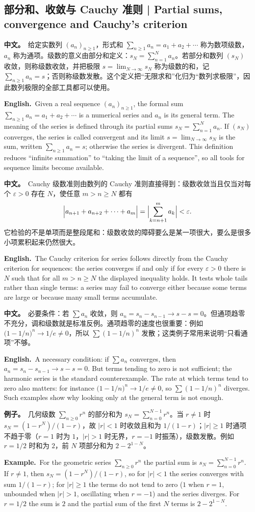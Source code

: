 \documentclass[UTF8,11pt,a4paper]{ctexart}
\newcommand{\BOTH}[2]{\par\noindent\textbf{中文。}\ #1\par\noindent\textbf{English.}\ #2\par}
\newcommand{\EX}[2]{\par\noindent\textbf{例子。}\ #1\par\noindent\textbf{Example.}\ #2\par}
\begin{document}
\subsection{部分和、收敛与 Cauchy 准则 | Partial sums, convergence and Cauchy's criterion}
\BOTH{给定实数列 $(a_n)_{n\ge1}$，形式和 $\sum_{n\ge1}a_n=a_1+a_2+\cdots$ 称为数项级数，$a_n$ 称为通项。级数的意义由部分和定义：$s_N=\sum_{n=1}^{N}a_n$。若部分和数列 $(s_N)$ 收敛，则称级数收敛，并把极限 $s=\lim_{N\to\infty}s_N$ 称为级数的和，记 $\sum_{n\ge1}a_n=s$；否则称级数发散。这个定义把“无限求和”化归为“数列求极限”，因此数列极限的全部工具都可以使用。}{Given a real sequence $(a_n)_{n\ge1}$, the formal sum $\sum_{n\ge1}a_n=a_1+a_2+\cdots$ is a numerical series and $a_n$ is its general term. The meaning of the series is defined through its partial sums $s_N=\sum_{n=1}^{N}a_n$. If $(s_N)$ converges, the series is called convergent and its limit $s=\lim_{N\to\infty}s_N$ is the sum, written $\sum_{n\ge1}a_n=s$; otherwise the series is divergent. This definition reduces “infinite summation” to “taking the limit of a sequence”, so all tools for sequence limits become available.}
\BOTH{Cauchy 级数准则由数列的 Cauchy 准则直接得到：级数收敛当且仅当对每个 $\varepsilon>0$ 存在 $N$，使任意 $m>n\ge N$ 都有
\[
\Bigl|a_{n+1}+a_{n+2}+\cdots+a_m\Bigr|=\Bigl|\sum_{k=n+1}^{m}a_k\Bigr|<\varepsilon .
\]
它检验的不是单项而是整段尾和：级数收敛的障碍要么是某一项很大，要么是很多小项累积起来仍然很大。}{The Cauchy criterion for series follows directly from the Cauchy criterion for sequences: the series converges if and only if for every $\varepsilon>0$ there is $N$ such that for all $m>n\ge N$ the displayed inequality holds. It tests whole tails rather than single terms: a series may fail to converge either because some terms are large or because many small terms accumulate.}
\BOTH{必要条件：若 $\sum a_n$ 收敛，则 $a_n=s_n-s_{n-1}\to s-s=0$。但通项趋零不充分，调和级数就是标准反例。通项趋零的速度也很重要：例如 $\bigl(1-1/n\bigr)^n\to1/e\ne0$，所以 $\sum(1-1/n)^n$ 发散；这类例子常用来说明“只看通项”不够。}{A necessary condition: if $\sum a_n$ converges, then $a_n=s_n-s_{n-1}\to s-s=0$. But terms tending to zero is not sufficient; the harmonic series is the standard counterexample. The rate at which terms tend to zero also matters: for instance $\bigl(1-1/n\bigr)^n\to1/e\ne0$, so $\sum(1-1/n)^n$ diverges. Such examples show why looking only at the general term is not enough.}
\EX{几何级数 $\sum_{n\ge0}r^n$ 的部分和为 $s_N=\sum_{n=0}^{N-1}r^n$。当 $r\ne1$ 时 $s_N=(1-r^N)/(1-r)$，故 $|r|<1$ 时收敛且和为 $1/(1-r)$；$|r|\ge1$ 时通项不趋于零（$r=1$ 时为 $1$，$|r|>1$ 时无界，$r=-1$ 时振荡），级数发散。例如 $r=1/2$ 时和为 $2$，前 $N$ 项部分和为 $2-2^{1-N}$。}{For the geometric series $\sum_{n\ge0}r^n$ the partial sum is $s_N=\sum_{n=0}^{N-1}r^n$. If $r\ne1$, then $s_N=(1-r^N)/(1-r)$, so for $|r|<1$ the series converges with sum $1/(1-r)$; for $|r|\ge1$ the terms do not tend to zero ($1$ when $r=1$, unbounded when $|r|>1$, oscillating when $r=-1$) and the series diverges. For $r=1/2$ the sum is $2$ and the partial sum of the first $N$ terms is $2-2^{1-N}$.}
\end{document}
